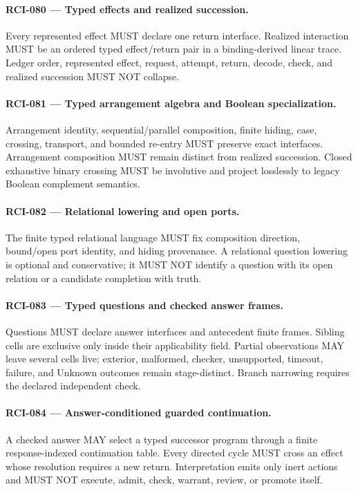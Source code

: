 \documentclass[11pt]{article}
\begin{document}
\paragraph{RCI-080 --- Typed effects and realized succession.}
Every represented effect MUST declare one return interface. Realized interaction MUST be
an ordered typed effect/return pair in a binding-derived linear trace. Ledger order,
represented effect, request, attempt, return, decode, check, and realized succession
MUST NOT collapse.

\paragraph{RCI-081 --- Typed arrangement algebra and Boolean specialization.}
Arrangement identity, sequential/parallel composition, finite hiding, case, crossing,
transport, and bounded re-entry MUST preserve exact interfaces. Arrangement composition
MUST remain distinct from realized succession. Closed exhaustive binary crossing MUST be
involutive and project losslessly to legacy Boolean complement semantics.

\paragraph{RCI-082 --- Relational lowering and open ports.}
The finite typed relational language MUST fix composition direction, bound/open port
identity, and hiding provenance. A relational question lowering is optional and
conservative; it MUST NOT identify a question with its open relation or a candidate
completion with truth.

\paragraph{RCI-083 --- Typed questions and checked answer frames.}
Questions MUST declare answer interfaces and antecedent finite frames. Sibling cells are
exclusive only inside their applicability field. Partial observations MAY leave several
cells live; exterior, malformed, checker, unsupported, timeout, failure, and Unknown
outcomes remain stage-distinct. Branch narrowing requires the declared independent check.

\paragraph{RCI-084 --- Answer-conditioned guarded continuation.}
A checked answer MAY select a typed successor program through a finite response-indexed
continuation table. Every directed cycle MUST cross an effect whose resolution requires
a new return. Interpretation emits only inert actions and MUST NOT execute, admit,
check, warrant, review, or promote itself.
\end{document}
